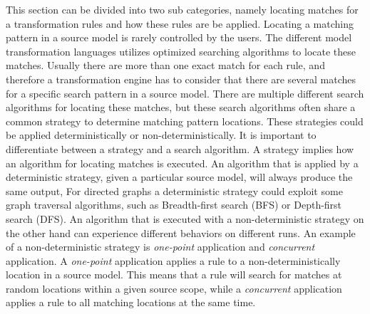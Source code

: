 This section can be divided into two sub categories, namely locating matches for
a transformation rules and how these rules are be applied. Locating a matching
pattern in a source model is rarely controlled by the users. The different
model transformation languages utilizes optimized searching algorithms to
locate these matches. Usually there are more than one exact match for each rule, and
therefore a transformation engine has to consider that there are several
matches for a specific search pattern in a source model. There are multiple
different search algorithms for locating these matches, but these search
algorithms often share a common strategy to determine matching pattern
locations. These strategies could be applied deterministically or
non-deterministically. It is important to differentiate between a
strategy and a search algorithm. A strategy implies how an algorithm for
locating matches is executed. An algorithm that is applied by a deterministic
strategy, given a particular source model, will always produce the same output,
For directed graphs a deterministic strategy could exploit some
graph traversal algorithms, such as Breadth-first search\cite{Dasgupta2006}
(BFS) or Depth-first\cite{Dasgupta2006} search (DFS).
An algorithm that is executed with a non-deterministic strategy on the other
hand can experience different behaviors on different runs. An example of a
non-deterministic strategy is \textit{one-point}
application\cite{Czarnecki2006} and \textit{concurrent} application. A
\textit{one-point} application applies a rule to a non-deterministically
location in a source model. This means that a rule will search for matches at
random locations within a given source scope, while a \textit{concurrent}
application applies a rule to all matching locations at the same time. 

